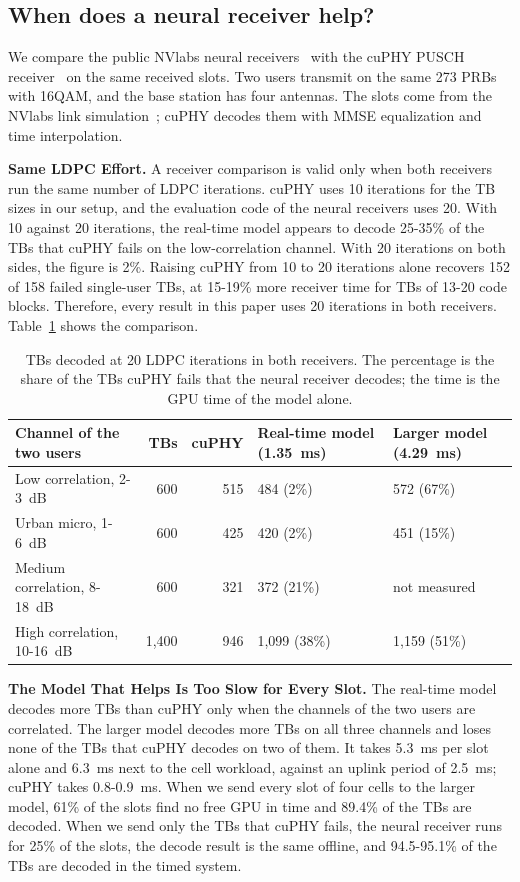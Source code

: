 \documentclass[acmsmall,screen,review,anonymous]{acmart}
\begin{document}
\subsection{When does a neural receiver help?}

We compare the public NVlabs neural receivers~\cite{nrx5g,nrxrt,neuralrxsw} with the cuPHY PUSCH
receiver~\cite{aerial} on the same received slots. Two users transmit on the same 273 PRBs with 16QAM, and
the base station has four antennas. The slots come from the NVlabs link simulation~\cite{sionna}; cuPHY
decodes them with MMSE equalization and time interpolation.

\noindent\textbf{Same LDPC Effort.} A receiver comparison is valid only when both receivers run the same
number of LDPC iterations. cuPHY uses 10 iterations for the TB sizes in our setup, and the evaluation code
of the neural receivers uses 20. With 10 against 20 iterations, the real-time model appears to decode
25-35\% of the TBs that cuPHY fails on the low-correlation channel. With 20 iterations on both sides, the
figure is 2\%. Raising cuPHY from 10 to 20 iterations alone recovers 152 of 158 failed single-user TBs, at
15-19\% more receiver time for TBs of 13-20 code blocks. Therefore, every result in this paper uses 20
iterations in both receivers. Table~\ref{tab:receivers} shows the comparison.

\begin{table}[t]
\caption{TBs decoded at 20 LDPC iterations in both receivers. The percentage is the share of the TBs cuPHY
fails that the neural receiver decodes; the time is the GPU time of the model alone.}
\label{tab:receivers}
\footnotesize
\begin{tabular}{@{}lrrll@{}}
\toprule
Channel of the two users & TBs & cuPHY & Real-time model (1.35~ms) & Larger model (4.29~ms) \\
\midrule
Low correlation, 2-3~dB & 600 & 515 & 484 (2\%) & 572 (67\%) \\
Urban micro, 1-6~dB & 600 & 425 & 420 (2\%) & 451 (15\%) \\
Medium correlation, 8-18~dB & 600 & 321 & 372 (21\%) & not measured \\
High correlation, 10-16~dB & 1,400 & 946 & 1,099 (38\%) & 1,159 (51\%) \\
\bottomrule
\end{tabular}
\end{table}

\noindent\textbf{The Model That Helps Is Too Slow for Every Slot.} The real-time model decodes more TBs
than cuPHY only when the channels of the two users are correlated. The larger model decodes more TBs on all
three channels and loses none of the TBs that cuPHY decodes on two of them. It takes 5.3~ms per slot alone
and 6.3~ms next to the cell workload, against an uplink period of 2.5~ms; cuPHY takes 0.8-0.9~ms. When we
send every slot of four cells to the larger model, 61\% of the slots find no free GPU in time and 89.4\% of
the TBs are decoded. When we send only the TBs that cuPHY fails, the neural receiver runs for 25\% of the
slots, the decode result is the same offline, and 94.5-95.1\% of the TBs are decoded in the timed system.
\end{document}

